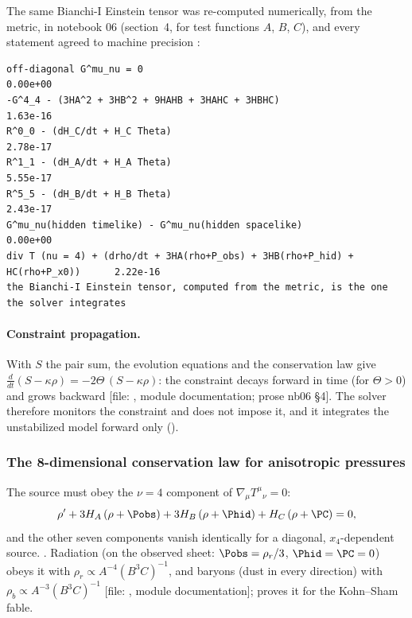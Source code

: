The same Bianchi-I Einstein tensor was re-computed numerically, from the metric, in notebook 06
(section~4, for test functions $A$, $B$, $C$), and every statement agreed to machine precision
:
\begin{Verbatim}[fontsize=\scriptsize]
off-diagonal G^mu_nu = 0                                                         0.00e+00
-G^4_4 - (3HA^2 + 3HB^2 + 9HAHB + 3HAHC + 3HBHC)                                 1.63e-16
R^0_0 - (dH_C/dt + H_C Theta)                                                    2.78e-17
R^1_1 - (dH_A/dt + H_A Theta)                                                    5.55e-17
R^5_5 - (dH_B/dt + H_B Theta)                                                    2.43e-17
G^mu_nu(hidden timelike) - G^mu_nu(hidden spacelike)                             0.00e+00
div T (nu = 4) + (drho/dt + 3HA(rho+P_obs) + 3HB(rho+P_hid) + HC(rho+P_x0))      2.22e-16
the Bianchi-I Einstein tensor, computed from the metric, is the one the solver integrates
\end{Verbatim}

\paragraph{Constraint propagation.} With $S$ the pair sum, the evolution equations and the conservation
law give $\frac{d}{dt}(S-\kappa\rho)=-2\Theta\,(S-\kappa\rho)$: the constraint decays forward in time
(for $\Theta>0$) and grows backward [file: ,
module documentation; prose nb06 \S4]. The solver therefore monitors the constraint and does not
impose it, and it integrates the unstabilized model forward only ().

\subsubsection{The 8-dimensional conservation law for anisotropic pressures}
\label{sec:4.3.5}

The source must obey the $\nu=4$ component of $\nabla_\mu T^\mu{}_\nu=0$:
\[
  \rho'+3H_A\,(\rho+\Pobs)+3H_B\,(\rho+\Phid)+H_C\,(\rho+\PC)=0 ,
\]
and the other seven components vanish identically for a diagonal, $x_4$-dependent source.
 .
Radiation (on the observed sheet: $\Pobs=\rho_r/3$, $\Phid=\PC=0$) obeys it with
$\rho_r\propto A^{-4}(B^3C)^{-1}$, and baryons (dust in every direction) with
$\rho_b\propto A^{-3}(B^3C)^{-1}$ [file: , module
documentation];  proves it for the Kohn--Sham fable.

